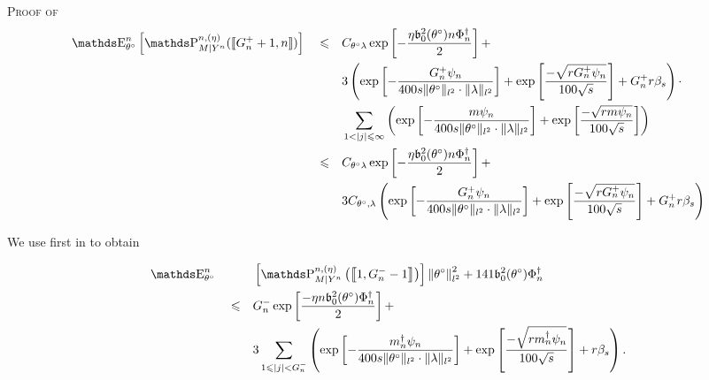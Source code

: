 \begin{pro}{\textsc{Proof of } \\}
\begin{alignat}{3}
& \E_{\theta^{\circ}}^{n}\left[\P_{M \vert Y^{n}}^{n, (\eta)}(\llbracket G^{+}_{n} + 1, n \rrbracket)\right] && \leq && C_{\theta^{\circ} \lambda} \exp \left[-\frac{\eta \mathfrak{b}_{0}^{2}(\theta^{\circ}) n \Phi^{\dagger}_{n}}{2}\right] +\notag\\
& && && 3 \left(\exp\left[- \frac{G^{+}_{n} \psi_{n}}{400 s \Vert \theta^{\circ} \Vert_{l^{2}} \cdot \Vert \lambda \Vert_{l^{2}}}\right] + \exp\left[ \frac{- \sqrt{r G^{+}_{n} \psi_{n}}}{100 \sqrt{s}}\right] + G^{+}_{n} r\beta_{s}\right) \cdot\notag\\
& && && \sum\limits_{1 < \vert j \vert \leq \infty} \left(\exp\left[- \frac{m \psi_{n}}{400 s \Vert \theta^{\circ} \Vert_{l^{2}} \cdot \Vert \lambda \Vert_{l^{2}}}\right] + \exp\left[ \frac{- \sqrt{r m \psi_{n}}}{100 \sqrt{s}}\right]\right)\notag\\
& && \leq && C_{\theta^{\circ} \lambda} \exp \left[-\frac{\eta \mathfrak{b}_{0}^{2}(\theta^{\circ}) n \Phi^{\dagger}_{n}}{2}\right] +\notag\\
& && && 3 C_{\theta^{\circ}, \lambda} \left(\exp\left[- \frac{G^{+}_{n} \psi_{n}}{400 s \Vert \theta^{\circ} \Vert_{l^{2}} \cdot \Vert \lambda \Vert_{l^{2}}}\right] + \exp\left[ \frac{- \sqrt{r G^{+}_{n} \psi_{n}}}{100 \sqrt{s}}\right] + G^{+}_{n} r\beta_{s}\right)\label{EQD.43}
\end{alignat}

We use first  in  to obtain

\begin{alignat}{3}
& \E_{\theta^{\circ}}^{n}&& &&\left[\P_{M \vert Y^{n}}^{n, (\eta)} \left(\left\llbracket 1, G^{-}_{n} - 1\right\rrbracket \right) \right] \left\Vert \theta^{\circ} \right\Vert_{l^{2}}^{2} + 141 \mathfrak{b}_{0}^{2}(\theta^{\circ}) \Phi^{\dagger}_{n}\notag\\
& && \leq && G^{-}_{n}\exp\left[\frac{- \eta n \mathfrak{b}_{0}^{2}(\theta^{\circ}) \Phi^{\dagger}_{n}}{2}\right] +\notag\\
& && && 3 \sum\limits_{1 \leq \vert j \vert < G^{-}_{n}}\left(\exp\left[- \frac{m^{\dagger}_{n} \psi_{n}}{400 s \Vert \theta^{\circ} \Vert_{l^{2}} \cdot \Vert \lambda \Vert_{l^{2}}}\right] + \exp\left[ \frac{- \sqrt{r m^{\dagger}_{n} \psi_{n}}}{100\sqrt{s}}\right] + r\beta_{s}\right).
\end{alignat}


\end{pro}

